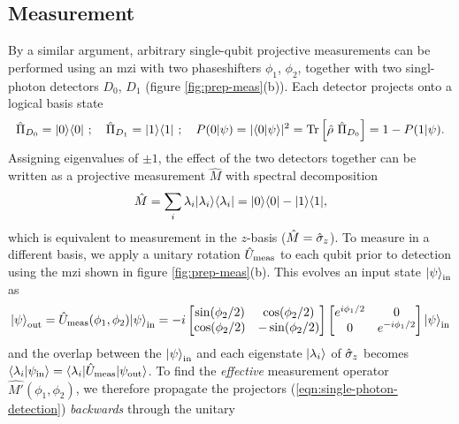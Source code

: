 \subsection{Measurement} 
\label{sec:cnotmz-measurement}
By a similar argument, arbitrary single-qubit projective measurements can be performed using an \gls{mzi} with two phaseshifters $\phi_1$, $\phi_2$, together with two singl-photon detectors $D_0$, $D_1$ (figure \ref{fig:prep-meas}(b)). Each detector projects onto a logical basis state
\begin{equation}
  \hat{\Pi}_{D_0} = \mbox{$ | 0 \rangle $}\mbox{$ \langle 0 | $} ~; \quad
  \hat{\Pi}_{D_1} = \mbox{$ | 1 \rangle $}\mbox{$ \langle 1 | $} ~; \quad 
  P(0|\psi) = |\langle 0 | \psi \rangle|^2 = \mathrm{Tr}\left[ \hat{\rho} ~ \hat{\Pi}_{D_0}\right]
  = 1 - P(1|\psi).
  \label{eqn:single-photon-detection}
\end{equation}
Assigning eigenvalues of $\pm1$, the effect of the two detectors together can be written as a projective measurement $\hat{M}$ with spectral decomposition
\begin{equation}
   \hat{M}=\sum_i \lambda_i \mbox{$ | \lambda_i \rangle $} \mbox{$ \langle \lambda_i | $} = \mbox{$ | 0 \rangle $}\mbox{$ \langle 0 | $} - \mbox{$ | 1 \rangle $}\mbox{$ \langle 1 | $},
\end{equation}
which is equivalent to measurement in the $z$-basis ($\hat{M}= \hat{\sigma}_z$). To measure in a different basis, we apply a unitary rotation $\hat{U}_\mathrm{meas}$ to each qubit prior to detection using the \gls{mzi} shown in figure \ref{fig:prep-meas}(b). This evolves an input state $\mbox{$ | \psi \rangle $}_{\mathrm{in}}$ as
\begin{equation}
    \mbox{$ | \psi \rangle $}_{\mathrm{out}} = \hat{U}_\mathrm{meas} (\phi_1, \phi_2) \mbox{$ | \psi \rangle $}_{\mathrm{in}}
    =
   -i
   \begin{bmatrix} 
   \sin(\phi_2 / 2) & \cos (\phi_2 / 2)\\
   \cos(\phi_2 / 2) & -\sin (\phi_2 / 2)
   \end{bmatrix} 
   \begin{bmatrix} 
   e^{ i \phi_1 / 2} & 0 \\
   0 & e^{- i \phi_1 /2} \\
   \end{bmatrix}
\mbox{$ | \psi \rangle $}_{\mathrm{in}}
\end{equation}
and the overlap between the $\mbox{$ | \psi \rangle $}_{\mathrm{in}}$ and each eigenstate $\mbox{$ | \lambda_i \rangle $}$ of $\hat{\sigma}_z$ becomes $\langle \lambda_i | \psi_{\mathrm{in}} \rangle = \mbox{$ \langle \lambda_i | $} \hat{U}_\mathrm{meas} \mbox{$ | \psi_{\mathrm{out}} \rangle $}$.
To find the \emph{effective} measurement operator $\hat{M'}(\phi_1, \phi_2)$, we therefore propagate the projectors (\ref{eqn:single-photon-detection}) \emph{backwards} through the unitary
